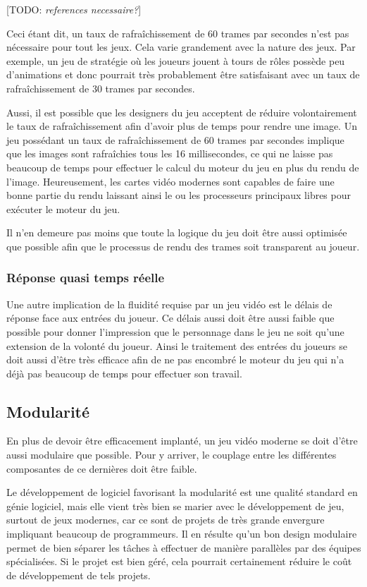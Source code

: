 \documentclass[12pt,oneside,letterpaper,francais]{book}
\newcommand{\todo}[1]{[TODO: {\it #1}]}
\begin{document}
\todo{references necessaire?}

Ceci étant dit, un taux de rafraîchissement de 60 trames par secondes
n'est pas nécessaire pour tout les jeux. Cela varie grandement avec la
nature des jeux. Par exemple, un jeu de stratégie où les joueurs
jouent à tours de rôles possède peu d'animations et donc pourrait très
probablement être satisfaisant avec un taux de rafraîchissement de 30
trames par secondes.

Aussi, il est possible que les designers du jeu acceptent de réduire
volontairement le taux de rafraîchissement afin d'avoir plus de temps
pour rendre une image. Un jeu possédant un taux de rafraîchissement de
60 trames par secondes implique que les images sont rafraîchies tous
les 16 millisecondes, ce qui ne laisse pas beaucoup de temps pour
effectuer le calcul du moteur du jeu en plus du rendu de
l'image. Heureusement, les cartes vidéo modernes sont capables de
faire une bonne partie du rendu laissant ainsi le ou les processeurs
principaux libres pour exécuter le moteur du jeu.

Il n'en demeure pas moins que toute la logique du jeu doit être aussi
optimisée que possible afin que le processus de rendu des trames soit
transparent au joueur.

\subsubsection{Réponse quasi temps réelle}

Une autre implication de la fluidité requise par un jeu vidéo est le
délais de réponse face aux entrées du joueur. Ce délais aussi doit
être aussi faible que possible pour donner l'impression que le
personnage dans le jeu ne soit qu'une extension de la volonté du
joueur. Ainsi le traitement des entrées du joueurs se doit aussi
d'être très efficace afin de ne pas encombré le moteur du jeu qui n'a
déjà pas beaucoup de temps pour effectuer son travail.

\subsection{Modularité}

En plus de devoir être efficacement implanté, un jeu vidéo moderne se
doit d'être aussi modulaire que possible. Pour y arriver, le couplage
entre les différentes composantes de ce dernières doit être faible. 

Le développement de logiciel favorisant la modularité est une qualité
standard en génie logiciel, mais elle vient très bien se marier avec
le développement de jeu, surtout de jeux modernes, car ce sont de
projets de très grande envergure impliquant beaucoup de
programmeurs. Il en résulte qu'un bon design modulaire permet de bien
séparer les tâches à effectuer de manière parallèles par des équipes
spécialisées. Si le projet est bien géré, cela pourrait certainement
réduire le coût de développement de tels projets.
\end{document}
